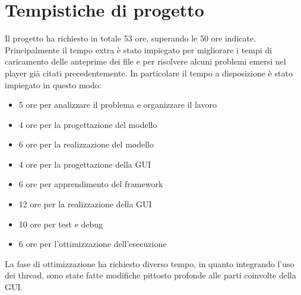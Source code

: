 \section{Tempistiche di progetto}

Il progetto ha richiesto in totale 53 ore, superando le 50 ore indicate. Principalmente il tempo extra è stato impiegato per migliorare i tempi di caricamento delle anteprime
dei file e per risolvere alcuni problemi emersi nel player già citati precedentemente. In particolare il tempo a disposizione è stato impiegato in questo modo:
\begin{itemize}
    \item 5 ore per analizzare il problema e organizzare il lavoro
    \item 4 ore per la progettazione del modello
    \item 6 ore per la realizzazione del modello
    \item 4 ore per la progettazione della GUI
    \item 6 ore per apprendimento del framework
    \item 12 ore per la realizzazione della GUI
    \item 10 ore per test e debug
    \item 6 ore per l'ottimizzazione dell'esecuzione
\end{itemize}
La fase di ottimizzazione ha richiesto diverso tempo, in quanto integrando l'uso dei thread, sono state fatte modifiche pittosto profonde alle parti coinvolte della GUI.
